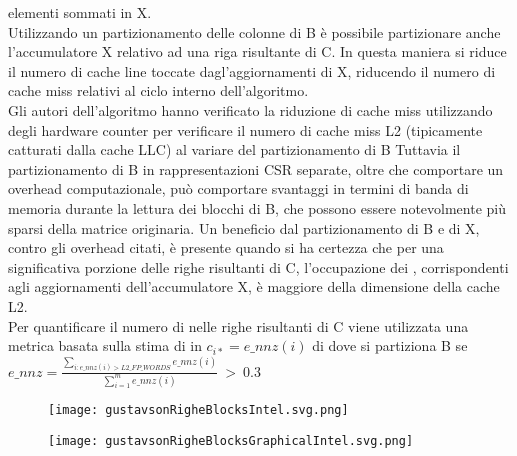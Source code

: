 elementi \nnz sommati in X.\\
Utilizzando un partizionamento delle colonne di B è possibile partizionare anche
l'accumulatore X relativo ad una riga risultante di C. In questa maniera si
riduce il numero di cache line toccate dagl'aggiornamenti di X, riducendo il
numero di cache miss relativi al ciclo interno dell'algoritmo.\\
Gli autori dell'algoritmo hanno verificato la riduzione di cache miss
utilizzando degli hardware counter per verificare il numero di cache miss L2
(tipicamente catturati dalla cache LLC) al variare del partizionamento di B %
Tuttavia il partizionamento di B in rappresentazioni CSR separate, 
oltre che comportare un overhead computazionale, può comportare svantaggi in
termini di banda di memoria durante la lettura dei blocchi di B, che possono
essere notevolmente più sparsi della matrice originaria. %
Un beneficio dal partizionamento di B e di X, contro gli overhead citati, è
presente quando si ha certezza che per una significativa porzione delle righe
risultanti di C, l'occupazione dei \nnz, corrispondenti agli aggiornamenti
dell'accumulatore X, è maggiore della dimensione della cache L2.\\
Per quantificare il numero di \nnz nelle righe risultanti di C viene utilizzata
una metrica basata sulla stima di \nnz in $c_{i*}=e\_nnz(i)$ di
\parencite{intelSpGEMMDenseAccumulator} %
dove si partiziona B se
$e\_nnz = \frac{\sum\limits_{i:e\_nnz(i) > L2\_FP\_WORDS} e\_nnz(i)}
{\sum\limits_{i=1}^m e\_nnz(i)} ~>~0.3$\\
\begin{figure}[h]
  \centering \texttt{[image: gustavsonRigheBlocksIntel.svg.png]}
  \caption[adattamento parallelo dell'algoritmo di Gustavson] \decoRule \label{figCode:gustavsonRigheBlocksIntel}
\end{figure}
\begin{figure}[h]
  \caption[rappresentazione grafica dell'adattamento parallelo dell'algoritmo di Gustavson] 
  \centering \texttt{[image: gustavsonRigheBlocksGraphicalIntel.svg.png]} \label{fig:gustavsonRigheBlocksGraphicalIntel}
\end{figure}

